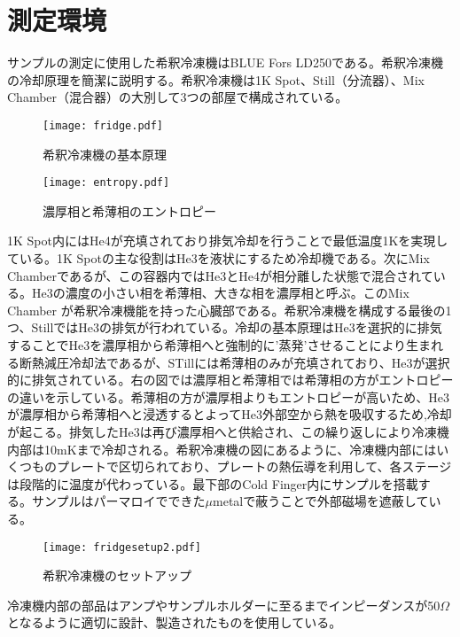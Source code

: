 \section{測定環境}
    サンプルの測定に使用した希釈冷凍機はBLUE Fors LD250である。希釈冷凍機の冷却原理を簡潔に説明する\cite*{fridge,fridge2}。希釈冷凍機は1K Spot、Still（分流器）、Mix Chamber（混合器）の大別して3つの部屋で構成されている。
    \begin{figure}[H]
        \begin{minipage}[t]{0.6\columnwidth}
            \centering
            \texttt{[image: fridge.pdf]}
            \caption{希釈冷凍機の基本原理}
        \end{minipage}%
        \begin{minipage}[t]{0.4\columnwidth}
            \centering
            \texttt{[image: entropy.pdf]}
            \caption{濃厚相と希薄相のエントロピー}
        \end{minipage}
    \end{figure}
    1K Spot内にはHe4が充填されており排気冷却を行うことで最低温度1Kを実現している。1K Spotの主な役割はHe3を液状にするため冷却機である。次にMix Chamberであるが、この容器内ではHe3とHe4が相分離した状態で混合されている。He3の濃度の小さい相を希薄相、大きな相を濃厚相と呼ぶ。このMix　Chamber が希釈冷凍機能を持った心臓部である。希釈冷凍機を構成する最後の1つ、StillではHe3の排気が行われている。冷却の基本原理はHe3を選択的に排気することでHe3を濃厚相から希薄相へと強制的に’蒸発’させることにより生まれる断熱減圧冷却法であるが、STillには希薄相のみが充填されており、He3が選択的に排気されている。右の図では濃厚相と希薄相では希薄相の方がエントロピーの違いを示している。希薄相の方が濃厚相よりもエントロピーが高いため、He3が濃厚相から希薄相へと浸透するとよってHe3外部空から熱を吸収するため,冷却が起こる。排気したHe3は再び濃厚相へと供給され、この繰り返しにより冷凍機内部は10mKまで冷却される。希釈冷凍機の図にあるように、冷凍機内部にはいくつものプレートで区切られており、プレートの熱伝導を利用して、各ステージは段階的に温度が代わっている。最下部のCold Finger内にサンプルを搭載する。サンプルはパーマロイでできた$\mu$metalで蔽うことで外部磁場を遮蔽している。
    \begin{figure}[H]
        \centering
        \texttt{[image: fridgesetup2.pdf]}
        \caption{希釈冷凍機のセットアップ}
    \end{figure}
    冷凍機内部の部品はアンプやサンプルホルダーに至るまでインピーダンスが50$\Omega$となるように適切に設計、製造されたものを使用している。
